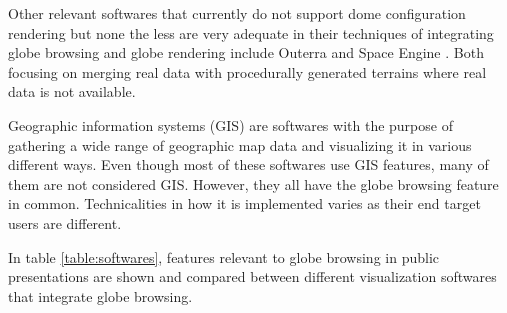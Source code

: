 Other relevant softwares that currently do not support dome configuration rendering but none the less are very adequate in their techniques of integrating globe browsing and globe rendering include Outerra \cite{outerra} and Space Engine \cite{spaceengine}. Both focusing on merging real data with procedurally generated terrains where real data is not available.

Geographic information systems (GIS) are softwares with the purpose of gathering a wide range of geographic map data and visualizing it in various different ways. Even though most of these softwares use GIS features, many of them are not considered GIS. However, they all have the globe browsing feature in common. Technicalities in how it is implemented varies as their end target users are different.

In table \ref{table:softwares}, features relevant to globe browsing in public presentations are shown and compared between different visualization softwares that integrate globe browsing.

\begin{center}
  \begin{table}
  \caption[]{Relevant features of different globe browsing softwares}
    \label{table:softwares}
  \end{table}
\end{center}

